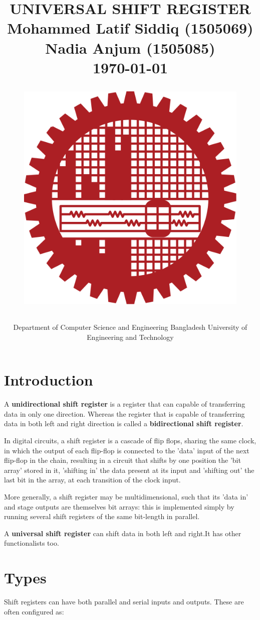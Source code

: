 \documentclass{article}
\title{
\centering
{\Huge UNIVERSAL SHIFT REGISTER\\}
\smallskip
\smallskip
\bigskip
{\LARGE Mohammed Latif Siddiq (1505069)\\}
\smallskip
{\LARGE Nadia Anjum (1505085)}
\medskip
\\
{\small \today}
\bigskip
\bigskip
\bigskip
\bigskip
\bigskip
\bigskip
\bigskip
\bigskip
\bigskip
\bigskip
\bigskip
\bigskip
\begin{figure}[h]
\centering
    \includegraphics[width= 0.2\linewidth]{pics/download.png}
    \label{fig:my_label}
\end{figure}
}
\author{
{\Large Department of Computer Science and Engineering}
{\Large Bangladesh University of Engineering and Technology}
\smallskip
\smallskip}
\date{}
\begin{document}
\maketitle
\newpage
\tableofcontents
\newpage
\begin{flushleft}

\section{Introduction}
A \textbf{unidirectional shift register} is a register that can capable of transferring data in only one direction. Whereas the register that is capable of transferring data in both left and right direction is called a \textbf{bidirectional shift register}.

In digital circuits, a shift register is a cascade of flip flops, sharing the same clock, in which the output of each flip-flop is connected to the 'data' input of the next flip-flop in the chain, resulting in a circuit that shifts by one position the 'bit array' stored in it, 'shifting in' the data present at its input and 'shifting out' the last bit in the array, at each transition of the clock input.

More generally, a shift register may be multidimensional, such that its 'data in' and stage outputs are themselves bit arrays: this is implemented simply by running several shift registers of the same bit-length in parallel.

\par A \textbf{universal shift register} can shift data in both left and right.It has other functionalists too.
\section{Types}
Shift registers can have both parallel and serial inputs and outputs. These are often configured as:
\end{flushleft}
\end{document}
